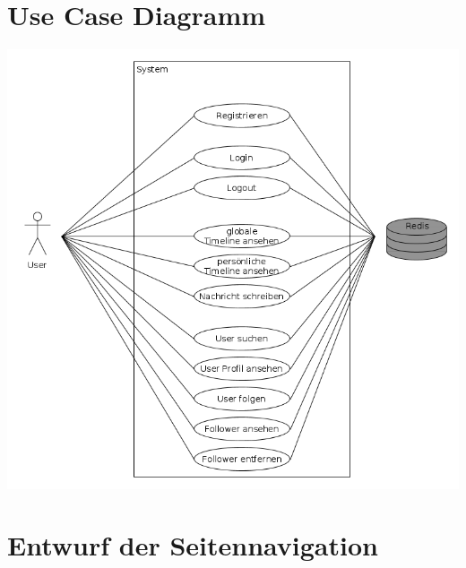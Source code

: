 \documentclass[
    a4paper
]{scrreprt}
\begin{document}
    \section{Use Case Diagramm}
    \includegraphics[width=\textwidth]{./images/useCaseDiagramm.png}
    \section{Entwurf der Seitennavigation}
    
\end{document}
